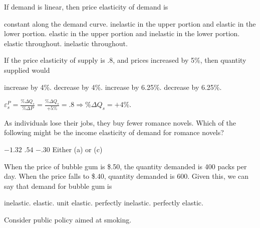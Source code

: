 \documentclass[addpoints,11pt]{exam}
\theoremstyle{definition}
\begin{document}
\begin{questions}
\question If demand is linear, then price elasticity of demand is 

\begin{choices}
	\choice constant along the demand curve.
	\choice inelastic in the upper portion and elastic in the lower portion.
	\CorrectChoice elastic in the upper portion and inelastic in the lower portion.
	\choice elastic throughout.
	\choice inelastic throughout.
\end{choices}

	
	\question If the price elasticity of supply is .8, and prices increased by 5\%, then quantity supplied would
		
		\begin{choices}
			\CorrectChoice increase by 4\%.
			\choice decrease by 4\%.
			\choice increase by 6.25\%.
			\choice decrease by 6.25\%.
		\end{choices}

	\begin{solution}
		$\varepsilon_s^P = \frac{\%\Delta Q_{s}}{\%\Delta P} = \frac{\%\Delta Q_{s}}{+5\%} = .8 \Rightarrow \%\Delta Q_{s} = +4\%.$
	\end{solution}
	
		\question As individuals lose their jobs, they buy fewer romance novels. Which of the following might be the income elasticity of demand for romance novels?
		
		\begin{choices}
			\choice $-1.32$
			\CorrectChoice $.54$
			\choice $-.30$
			\choice Either (a) or (c)
		\end{choices}
		
		
\question When the price of bubble gum is \$.50, the quantity demanded is 400 packs per day. When the price falls to \$.40, quantity demanded is 600. Given this, we can say that demand for bubble gum is 

\begin{choices}
	\choice inelastic.
	\CorrectChoice elastic.
	\choice unit elastic.
	\choice perfectly inelastic.
	\choice perfectly elastic.
\end{choices}
	
	\question Consider public policy aimed at smoking.
	
\end{questions}
\end{document}
